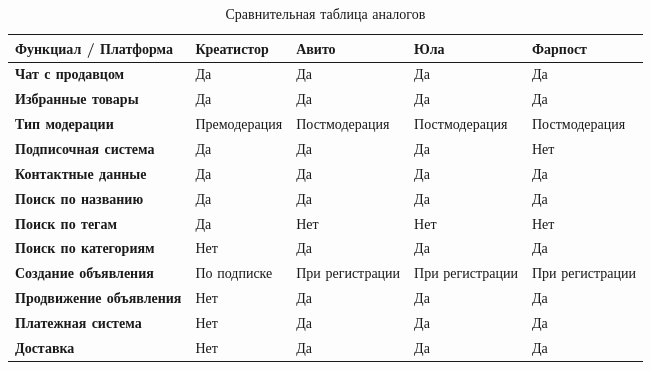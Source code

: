 \documentclass[a4paper,14pt]{extarticle}
\begin{document}
\begin{center}
    \begin{longtable}{|>{\centering\arraybackslash}m{3.5cm}|>{\centering\arraybackslash}m{2.7cm}|>{\centering\arraybackslash}m{2.7cm}|>{\centering\arraybackslash}m{2.7cm}|>{\centering\arraybackslash}m{2.7cm}|}
        \caption{Сравнительная таблица аналогов}
        \label{tab:comparison}
        \\
        \hline
        \textbf{Функциал / Платформа}   & \textbf{Креатистор} & \textbf{Авито}  & \textbf{Юла}    & \textbf{Фарпост} \\
        \hline
        \textbf{Чат с продавцом}        & Да                  & Да              & Да              & Да               \\
        \hline
        \textbf{Избранные товары}       & Да                  & Да              & Да              & Да               \\
        \hline
        \textbf{Тип модерации}          & Премодерация        & Постмодерация   & Постмодерация   & Постмодерация    \\
        \hline
        \textbf{Подписочная система}    & Да                  & Да              & Да              & Нет              \\
        \hline
        \textbf{Контактные данные}      & Да                  & Да              & Да              & Да               \\
        \hline
        \textbf{Поиск по названию}      & Да                  & Да              & Да              & Да               \\
        \hline
        \textbf{Поиск по тегам}         & Да                  & Нет             & Нет             & Нет              \\
        \hline
        \textbf{Поиск по категориям}    & Нет                 & Да              & Да              & Да               \\
        \hline
        \textbf{Создание объявления}    & По подписке         & При регистрации & При регистрации & При регистрации  \\
        \hline
        \textbf{Продвижение объявления} & Нет                 & Да              & Да              & Да               \\
        \hline
        \textbf{Платежная система}      & Нет                 & Да              & Да              & Да               \\
        \hline
        \textbf{Доставка}               & Нет                 & Да              & Да              & Да               \\
        \hline
    \end{longtable}
\end{center}
\end{document}
